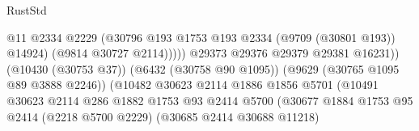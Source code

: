\begin{lexlean}{RustStd}
\begin{coremodule}
                                                            @11
                                                            @2334
                                                            @2229
                                                            (@30796
                                                              @193
                                                              @1753
                                                              @193
                                                              @2334
                                                              (@9709 (@30801 @193))
                                                              @14924)
                                                            (@9814 @30727 @2114)))))
                                                    @29373
                                                    @29376
                                                    @29379
                                                    @29381
                                                    @16231))
                                                (@10430 (@30753 @37))
                                                (@6432 (@30758 @90 @1095))
                                                (@9629 (@30765 @1095 @89 @3888 @2246))
                                                (@10482
                                                  @30623
                                                  @2114
                                                  @1886
                                                  @1856
                                                  @5701
                                                  (@10491
                                                    @30623
                                                    @2114
                                                    @286
                                                    @1882
                                                    @1753
                                                    @93
                                                    @2414
                                                    @5700
                                                    (@30677
                                                      @1884
                                                      @1753
                                                      @95
                                                      @2414
                                                      (@2218 @5700 @2229)
                                                      (@30685 @2414 @30688 @11218)

\end{coremodule}
\end{lexlean}
